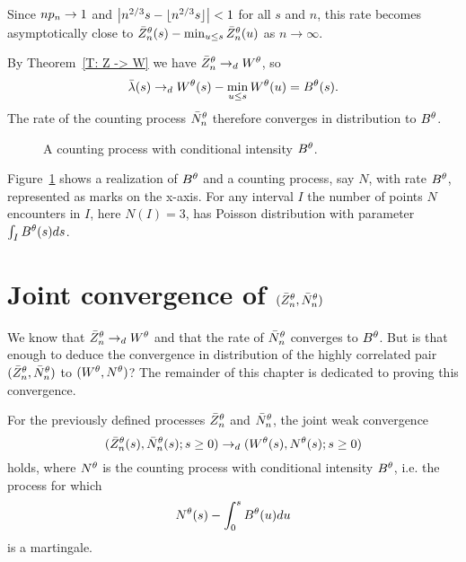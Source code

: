 Since $np_n \rightarrow 1$ and $\left|n^{2 / 3}s - \lfloor n^{2 / 3}s\rfloor\right| < 1$ for all $s$ and $n$,
this rate becomes asymptotically close to $\bar{Z}^{\theta}_n(s) - \min_{u \leq s}\bar{Z}^{\theta}_n(u)$ as $n \rightarrow \infty$.

By Theorem~\ref{T: Z -> W} we have $\bar{Z}^{\theta}_n \rightarrow_d W^{\theta}$,
so
\begin{equation}
\bar{\lambda}(s) \rightarrow_d W^{\theta}(s) - \min_{u \leq s}W^{\theta}(u) = B^{\theta}(s).
\end{equation}
The rate of the counting process $\bar{N}_n^{\theta}$ therefore converges in distribution to $B^{\theta}$.

\begin{figure}[ht]
	\centering
	
	\caption{A counting process with conditional intensity $B^{\theta}$.} 
	\label{F: area points}
\end{figure}

Figure~\ref{F: area points} shows a realization of $B^{\theta}$ and a counting process, say $N$, with rate $B^{\theta}$,
represented as marks on the x-axis.
For any interval $I$ the number of points $N$ encounters in $I$, here $N(I) = 3$, 
has Poisson distribution with parameter $\int_{I}B^{\theta}(s)ds$.


\section{Joint convergence of $(\bar{Z}^{\theta}_n, \bar{N}_n^{\theta})$}

We know that $\bar{Z}^{\theta}_n \rightarrow_d W^{\theta}$ and that the rate of $\bar{N}_n^{\theta}$ converges to $B^{\theta}$.
But is that enough to deduce the convergence in distribution of the highly correlated pair $(\bar{Z}^{\theta}_n, \bar{N}_n^{\theta})$ to $(W^{\theta}, N^{\theta})$?
The remainder of this chapter is dedicated to proving this convergence.


\begin{theorem} \label{T: Joint Convergence}
	For the previously defined processes $\bar{Z}^{\theta}_n$ and $\bar{N}_n^{\theta}$,
	the joint weak convergence
	\begin{equation*}
	( \bar{Z}^{\theta}_n(s), \bar{N}_n^{\theta}(s); s \geq 0 ) \rightarrow_d (W^{\theta}(s), N^{\theta}(s); s \geq 0)
	\end{equation*}
	holds, where $N^{\theta}$ is the counting process with conditional intensity $B^{\theta}$,
	i.e. the process for which
	\begin{equation*}
	N^{\theta}(s) - \int_{0}^s B^{\theta}(u)du
	\end{equation*}
	is a martingale.
\end{theorem}

